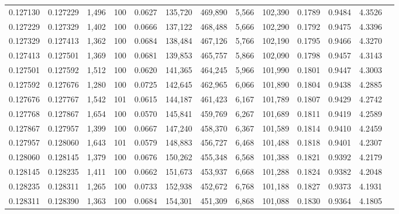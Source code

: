 \begin{tabular}{rrrrrrrrrrrrr}
0.127130 & 0.127229 & 1,496 & 100 &                                     0.0627 & 135,720 & 469,890 &   5,566 & 102,390 & 0.1789 & 0.9484 & 4.3526 \\
0.127229 & 0.127329 & 1,402 & 100 &                                     0.0666 & 137,122 & 468,488 &   5,666 & 102,290 & 0.1792 & 0.9475 & 4.3396 \\
0.127329 & 0.127413 & 1,362 & 100 &                                     0.0684 & 138,484 & 467,126 &   5,766 & 102,190 & 0.1795 & 0.9466 & 4.3270 \\
0.127413 & 0.127501 & 1,369 & 100 &                                     0.0681 & 139,853 & 465,757 &   5,866 & 102,090 & 0.1798 & 0.9457 & 4.3143 \\
0.127501 & 0.127592 & 1,512 & 100 &                                     0.0620 & 141,365 & 464,245 &   5,966 & 101,990 & 0.1801 & 0.9447 & 4.3003 \\
0.127592 & 0.127676 & 1,280 & 100 &                                     0.0725 & 142,645 & 462,965 &   6,066 & 101,890 & 0.1804 & 0.9438 & 4.2885 \\
0.127676 & 0.127767 & 1,542 & 101 &                                     0.0615 & 144,187 & 461,423 &   6,167 & 101,789 & 0.1807 & 0.9429 & 4.2742 \\
0.127768 & 0.127867 & 1,654 & 100 &                                     0.0570 & 145,841 & 459,769 &   6,267 & 101,689 & 0.1811 & 0.9419 & 4.2589 \\
0.127867 & 0.127957 & 1,399 & 100 &                                     0.0667 & 147,240 & 458,370 &   6,367 & 101,589 & 0.1814 & 0.9410 & 4.2459 \\
0.127957 & 0.128060 & 1,643 & 101 &                                     0.0579 & 148,883 & 456,727 &   6,468 & 101,488 & 0.1818 & 0.9401 & 4.2307 \\
0.128060 & 0.128145 & 1,379 & 100 &                                     0.0676 & 150,262 & 455,348 &   6,568 & 101,388 & 0.1821 & 0.9392 & 4.2179 \\
0.128145 & 0.128235 & 1,411 & 100 &                                     0.0662 & 151,673 & 453,937 &   6,668 & 101,288 & 0.1824 & 0.9382 & 4.2048 \\
0.128235 & 0.128311 & 1,265 & 100 &                                     0.0733 & 152,938 & 452,672 &   6,768 & 101,188 & 0.1827 & 0.9373 & 4.1931 \\
0.128311 & 0.128390 & 1,363 & 100 &                                     0.0684 & 154,301 & 451,309 &   6,868 & 101,088 & 0.1830 & 0.9364 & 4.1805 \\

\end{tabular}
